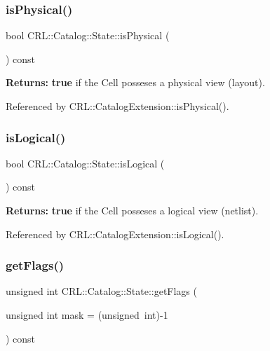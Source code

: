 \subsubsection{\texorpdfstring{is\+Physical()}{isPhysical()}}
{\footnotesize\ttfamily bool C\+R\+L\+::\+Catalog\+::\+State\+::is\+Physical (\begin{DoxyParamCaption}{ }\end{DoxyParamCaption}) const\hspace{0.3cm}{\ttfamily [inline]}}

{\bfseries Returns\+:} {\bfseries true} if the Cell posseses a physical view (layout). 

Referenced by C\+R\+L\+::\+Catalog\+Extension\+::is\+Physical().

\mbox{\label{classCRL_1_1Catalog_1_1State_a07aad28830a57090cf9203b0ff8714b1}} 
\subsubsection{\texorpdfstring{is\+Logical()}{isLogical()}}
{\footnotesize\ttfamily bool C\+R\+L\+::\+Catalog\+::\+State\+::is\+Logical (\begin{DoxyParamCaption}{ }\end{DoxyParamCaption}) const\hspace{0.3cm}{\ttfamily [inline]}}

{\bfseries Returns\+:} {\bfseries true} if the Cell posseses a logical view (netlist). 

Referenced by C\+R\+L\+::\+Catalog\+Extension\+::is\+Logical().

\mbox{\label{classCRL_1_1Catalog_1_1State_a80ac3efddd043ec7151680755cc3db42}} 
\subsubsection{\texorpdfstring{get\+Flags()}{getFlags()}}
{\footnotesize\ttfamily unsigned int C\+R\+L\+::\+Catalog\+::\+State\+::get\+Flags (\begin{DoxyParamCaption}\item[{unsigned int}]{mask = {\ttfamily (unsigned~int)-\/1} }\end{DoxyParamCaption}) const\hspace{0.3cm}{\ttfamily [inline]}}

